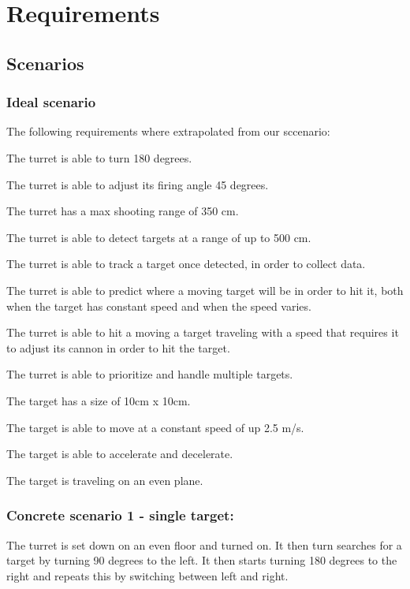 \chapter{Requirements}
\section{Scenarios}




\subsection{Ideal scenario}

The following requirements where extrapolated from our sccenario:\nl

The turret is able to turn 180 degrees.\nl

The turret is able to adjust its firing angle 45 degrees.\nl
 
The turret has a max shooting range of 350 cm.\nl

The turret is able to detect targets at a range of up to 500 cm.\nl

The turret is able to track a target once detected, in order to collect data.\nl

The turret is able to predict where a moving target will be in order to hit it,
both when the target has constant speed and when the speed varies.\nl

The turret is able to hit a moving a target traveling with a speed that
requires it to adjust its cannon in order to hit the target.\nl

The turret is able to prioritize and handle multiple targets.\nl

The target has a size of 10cm x 10cm.\nl

The target is able to move at a constant speed of up 2.5 m/s.\nl

The target is able to accelerate and decelerate.\nl

The target is traveling on an even plane.\nl



\subsection{Concrete scenario 1 - single target:}
The turret is set down on an even floor and turned on. It then turn searches
for a target by turning 90 degrees to the left. It then starts turning 180
degrees to the right and repeats this by switching between left and right.\nl

